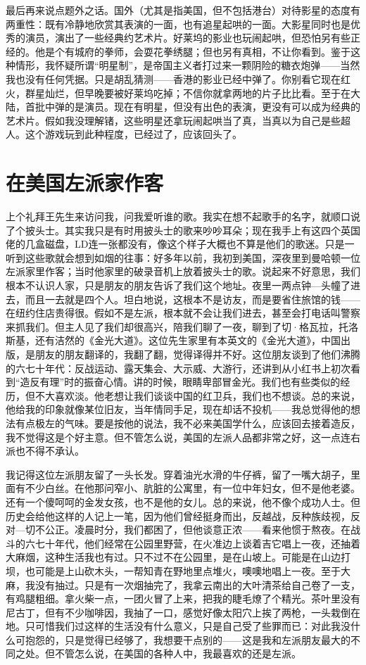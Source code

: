 最后再来说点题外之话。国外（尤其是指美国，但不包括港台）对待影星的态度有两重性：既有冷静地欣赏其表演的一面，也有追星起哄的一面。大影星同时也是优秀的演员，演出了一些经典约艺术片。好莱坞的影业也玩闹起哄，但恐怕另有些正经的。他是个有城府的拳师，会耍花拳绣腿；但也另有真相，不让你看到。鉴于这种情形，我怀疑所谓“明星制”，是帝国主义者打过来一颗阴险的糖衣炮弹——当然我也没有任何凭据。只是胡乱猜测——香港的影业已经中弹了。你别看它现在红火，群星灿烂，但早晚要被好莱坞吃掉；不信你就拿两地的片子比比看。至于在大陆，首批中弹的是演员。现在有明星，但没有出色的表演，更没有可以成为经典的艺术片。假如我没理解锗，这些明星还拿玩闹起哄当了真，当真以为自己是些超人。这个游戏玩到此种程度，已经过了，应该回头了。
 
\chapter{在美国左派家作客}

上个礼拜王先生来访问我，问我爱听谁的歌。我实在想不起歌手的名字，就顺口说了个披头士。其实我只是有时用披头士的歌来吵吵耳朵；现在我手上有这四个英国佬的几盒磁盘，LD连一张都没有，像这个样子大概也不算是他们的歌迷。只是一听到这些歌就会想到如烟的往事：好多年以前，我初到美国，深夜里到曼哈顿一位左派家里作客；当时他家里的破录音机上放着披头士的歌。说起来不好意思，我们根本不认识人家，只是朋友的朋友告诉了我们这个地址。夜里一两点钟—头幢了进去，而且一去就是四个人。坦白地说，这根本不是访友，而是要省住旅馆的钱——在纽约住店贵得很。假如不是左派，根本就不会让我们进去，甚至会打电话叫警察来抓我们。但主人见了我们却很高兴，陪我们聊了一夜，聊到了切·格瓦拉，托洛斯基，还有洁然的《金光大道》。这位先生家里有本英文的《金光大道》，中国出版，是朋友的朋友翻译的，我翻了翻，觉得译得并不好。这位朋友谈到了他们沸腾的六七十年代：反战运动、露天集会、大示威、大游行，还讲到从小红书上初次看到“造反有理”时的振奋心情。讲的时候，眼睛卑部冒金光。我们也有些类似的经历，但不大喜欢淡。他老想让我们谈谈中国的红卫兵，我们也不想谈。总的来说，他给我的印象就像某位旧友，当年情同手足，现在却话不投机——我总觉得他的想法有点极左的气味。要是按他的说法，我不必来美国学什么，应该回去接着造反，我不觉得这是个好主意。但不管怎么说，美国的左派人品都非常之好，这一点连右派也不得不承认。 

我记得这位左派朋友留了一头长发。穿着油光水滑的牛仔裤，留了一嘴大胡子，里面有不少白丝。在他那问窄小、肮脏的公寓里，有一位中年妇女，但不是他老婆。还有一个傻呵呵的金发女孩，也不是他的女儿。总的来说，他不像个成功人士。但历史会给他这样的人记上一笔，因为他们曾经挺身而出，反越战，反种族歧视，反对—切不公正。凌晨时分，我们都困了，但他谈意正浓——看来他惯于熬夜。在战斗的六七十年代，他们经常在公园里野营，在火准边上谈着吉它唱上一夜，还抽着大麻烟，这种生活我也有过。只不过不在公园里，是在山坡上。可能是在山边打坝，也可能是上山砍木头，一帮知青在野地里点堆火，噢噢地唱上一夜。至于大麻，我没有抽过。只是有一次烟抽完了，我拿云南出的大叶清茶给自己卷了一支，有鸡腿粗细。拿火柴一点，一团火冒了上来，把我的睫毛燎了个精光。茶叶里没有尼古丁，但有不少咖啡因，我抽了一口，感觉好像太阳穴上挨了两枪，一头栽倒在地。只可惜我们过这样的生活没有什么意义，只是自己受了些罪而已：对此我没什么可抱怨的，只是觉得已经够了，我想要干点别的——这是我和左派朋友最大的不同之处。但不管怎么说，在美国的各种人中，我最喜欢的还是左派。
 
